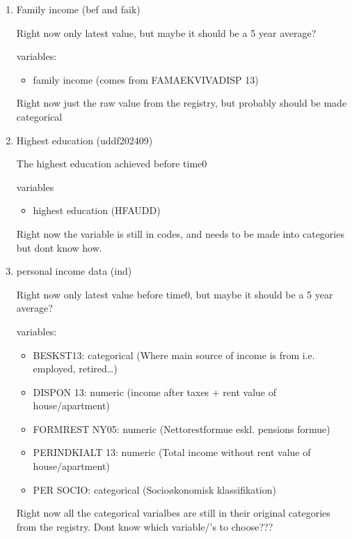 \documentclass[11pt]{article}
\begin{document}
\begin{enumerate}
0/1 variable, indicating if the persons mom/dad have a diabetes diagnosis. Should NA's be 0 or a third option indicating 'dont know'?
NOTE: NA's only occur if we can't find the parents in the registers. 0's are if we can find the parent in bef and they are not in dmreg.


\item Family income (bef and faik)
\label{sec:orge36a0c0}

Right now only latest value, but maybe it should be a 5 year average?

variables:
\begin{itemize}
\item family income (comes from FAMAEKVIVADISP 13)
\end{itemize}


Right now just the raw value from the registry, but probably should be made categorical


\item Highest education (uddf202409)
\label{sec:orgb0ff906}

The highest education achieved before time0

variables
\begin{itemize}
\item highest education (HFAUDD)
\end{itemize}


Right now the variable is still in codes, and needs to be made into categories but dont know how.


\item personal income data (ind)
\label{sec:org59bacfa}

Right now only latest value before time0, but maybe it should be a 5 year average?

variables:
\begin{itemize}
\item BESKST13: categorical (Where main source of income is from i.e. employed, retired\ldots{})
\item DISPON 13: numeric (income after taxes + rent value of house/apartment)
\item FORMREST NY05: numeric (Nettorestformue eskl. pensions formue)
\item PERINDKIALT 13: numeric (Total income without rent value of house/apartment)
\item PER SOCIO: categorical (Socioøkonomisk klassifikation)
\end{itemize}


Right now all the categorical varialbes are still in their original categories from the registry. Dont know which variable/'s to choose???



\end{enumerate}
\end{document}
